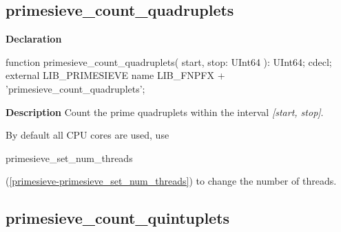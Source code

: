 \documentclass{report}
\newif\ifpdf
\begin{document}
\subsection*{primesieve{\_}count{\_}quadruplets}
\fi
\label{primesieve-primesieve_count_quadruplets}
\begin{list}{}{
\setlength{\itemindent}{0cm}
\setlength{\listparindent}{0cm}
\setlength{\leftmargin}{\evensidemargin}
\addtolength{\leftmargin}{\tmplength}
\settowidth{\labelsep}{X}
\addtolength{\leftmargin}{\labelsep}
\setlength{\labelwidth}{\tmplength}
}
\item[\textbf{Declaration}\hfill]
\ifpdf
\begin{flushleft}
\fi
\begin{ttfamily}
function primesieve{\_}count{\_}quadruplets( start, stop: UInt64 ): UInt64; cdecl; external LIB{\_}PRIMESIEVE name LIB{\_}FNPFX + 'primesieve{\_}count{\_}quadruplets';\end{ttfamily}

\ifpdf
\end{flushleft}
\fi

\par
\item[\textbf{Description}]
Count the prime quadruplets within the interval \textit{[start, stop]}.

By default all CPU cores are used, use \begin{ttfamily}primesieve{\_}set{\_}num{\_}threads\end{ttfamily}(\ref{primesieve-primesieve_set_num_threads}) to change the number of threads.

\end{list}
\ifpdf
\subsection*{\large{\textbf{primesieve{\_}count{\_}quintuplets}}\normalsize\hspace{1ex}\hrulefill}
\else
\end{document}
